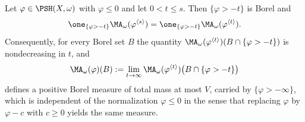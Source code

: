 \begin{lemma}
\label{lem:ch26-layers}
Let \(\varphi\in\PSH(X,\omega)\) with \(\varphi\leq0\) and let
\(0<t\leq s\).  Then \(\{\varphi>-t\}\) is Borel and
\begin{equation}
\label{eq:ch26-layer-consistency}
 \one_{\{\varphi>-t\}}\MA_\omega(\varphi^{\langle s\rangle})
 =\one_{\{\varphi>-t\}}\MA_\omega(\varphi^{\langle t\rangle}).
\end{equation}
Consequently, for every Borel set \(B\) the quantity
\(\MA_\omega(\varphi^{\langle t\rangle})(B\cap\{\varphi>-t\})\) is
nondecreasing in \(t\), and
\begin{equation}
\label{eq:ch26-npp-definition}
 \MA_\omega(\varphi)(B)
 :=\lim_{t\to\infty}
  \MA_\omega(\varphi^{\langle t\rangle})
   \bigl(B\cap\{\varphi>-t\}\bigr)
\end{equation}
defines a positive Borel measure of total mass at most \(V\), carried by
\(\{\varphi>-\infty\}\), which is independent of the normalization
\(\varphi\leq0\) in the sense that replacing \(\varphi\) by \(\varphi-c\)
with \(c\geq0\) yields the same measure.
\end{lemma}

